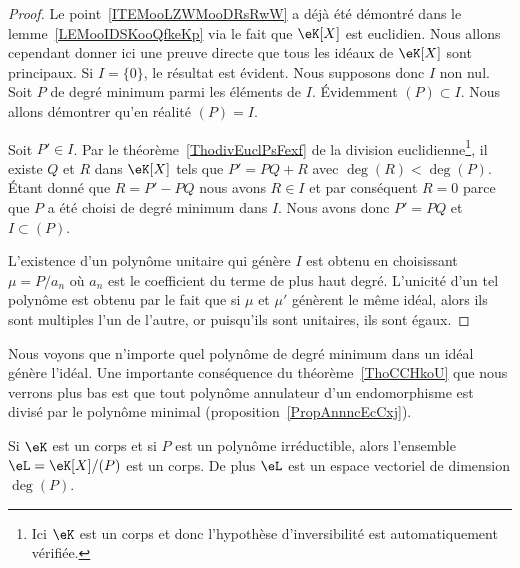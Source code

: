 \begin{proof}
    Le point~\ref{ITEMooLZWMooDRsRwW} a déjà été démontré dans le lemme~\ref{LEMooIDSKooQfkeKp} via le fait que \( \eK[X]\) est euclidien. Nous allons cependant donner ici une preuve directe que tous les idéaux de \( \eK[X]\) sont principaux. Si \( I=\{ 0 \}\), le résultat est évident. Nous supposons donc \( I\) non nul. Soit \( P\) de degré minimum parmi les éléments de \( I\). Évidemment \( (P)\subset I\). Nous allons démontrer qu'en réalité \( (P)=I\).

    Soit \( P'\in I\). Par le théorème~\ref{ThodivEuclPsFexf} de la division euclidienne\footnote{Ici \( \eK\) est un corps et donc l'hypothèse d'inversibilité est automatiquement vérifiée.}, il existe \( Q\) et \( R\) dans \( \eK[X]\) tels que \( P'=PQ+R\) avec \( \deg(R)<\deg(P)\). Étant donné que \( R=P'-PQ\) nous avons \( R\in I\) et par conséquent \( R=0\) parce que \( P\) a été choisi de degré minimum dans \( I\). Nous avons donc \( P'=PQ\) et \( I\subset (P)\).

    L'existence d'un polynôme unitaire qui génère \( I\) est obtenu en choisissant \( \mu =P/a_n\) où \( a_n\) est le coefficient du terme de plus haut degré. L'unicité d'un tel polynôme est obtenu par le fait que si \( \mu \) et \( \mu' \) génèrent le même idéal, alors ils sont multiples l'un de l'autre, or puisqu'ils sont unitaires, ils sont égaux.
\end{proof}
Nous voyons que n'importe quel polynôme de degré minimum dans un idéal génère l'idéal. Une importante conséquence du théorème~\ref{ThoCCHkoU} que nous verrons plus bas est que tout polynôme annulateur d'un endomorphisme est divisé par le polynôme minimal (proposition~\ref{PropAnnncEcCxj}).

\begin{corollary}       \label{CorsLGiEN}
    Si \( \eK\) est un corps et si \( P\) est un polynôme irréductible, alors l'ensemble \( \eL=\eK[X]/(P)\) est un corps. De plus \( \eL\) est un espace vectoriel de dimension \( \deg(P)\).
\end{corollary}

